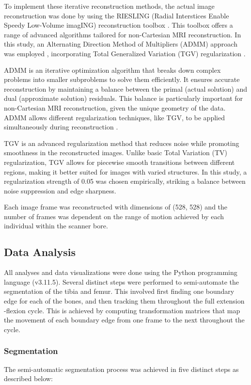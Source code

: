 \documentclass{micro-econ-thesis}
\begin{document}
To implement these iterative reconstruction methods, the actual image reconstruction was done by using the RIESLING (Radial Interstices Enable Speedy Low-Volume imagING)   reconstruction toolbox \parencite{wood2020riesling}. This toolbox offers a range of advanced algorithms tailored for non-Cartesian MRI reconstruction. In this study, an Alternating Direction Method of Multipliers (ADMM) approach was employed \parencite{MAL-016}, incorporating Total Generalized Variation (TGV) regularization \parencite{tgv}. 

ADMM is an iterative optimization algorithm that breaks down complex problems into smaller subproblems to solve them efficiently. It ensures accurate reconstruction by maintaining a balance between the primal (actual solution) and dual (approximate solution) residuals. This balance is particularly important for non-Cartesian MRI reconstruction, given the unique geometry of the data. ADMM allows different regularization techniques, like TGV, to be applied simultaneously during reconstruction . 

TGV is an advanced regularization method that reduces noise while promoting smoothness in the reconstructed images. Unlike basic Total Variation (TV) regularization, TGV allows for piecewise smooth transitions between different regions, making it better suited for images with varied structures. In this study, a regularization strength of 0.05 was chosen empirically, striking a balance between noise suppression and edge sharpness.

Each image frame was reconstructed with dimensions of (528, 528) and the number of frames was dependent on the range of motion achieved by each individual within the scanner bore.


\subsection{Data Analysis}
All analyses and data visualizations were done using the Python programming language (v3.11.5). Several distinct steps were performed to semi-automate the segmentation of the tibia and femur. This involved first finding one boundary edge for each of the bones, and then tracking them throughout the full extension -flexion cycle. This is achieved by computing transformation matrices that map the movement of each boundary edge from one frame to the next throughout the cycle. 
 
\subsubsection{Segmentation}
The semi-automatic segmentation process was achieved in five distinct steps as described below: 
\end{document}
